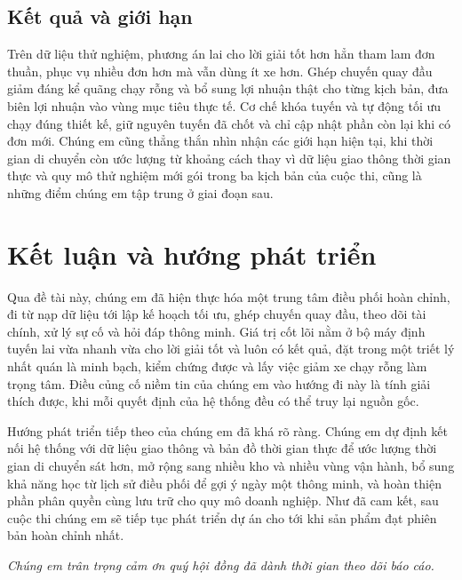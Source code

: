\documentclass[12pt,a4paper,oneside]{report}
\begin{document}
\section{Kết quả và giới hạn}
Trên dữ liệu thử nghiệm, phương án lai cho lời giải tốt hơn hẳn tham lam đơn thuần, phục vụ nhiều đơn hơn mà vẫn dùng ít xe hơn. Ghép chuyến quay đầu giảm đáng kể quãng chạy rỗng và bổ sung lợi nhuận thật cho từng kịch bản, đưa biên lợi nhuận vào vùng mục tiêu thực tế. Cơ chế khóa tuyến và tự động tối ưu chạy đúng thiết kế, giữ nguyên tuyến đã chốt và chỉ cập nhật phần còn lại khi có đơn mới. Chúng em cũng thẳng thắn nhìn nhận các giới hạn hiện tại, khi thời gian di chuyển còn ước lượng từ khoảng cách thay vì dữ liệu giao thông thời gian thực và quy mô thử nghiệm mới gói trong ba kịch bản của cuộc thi, cũng là những điểm chúng em tập trung ở giai đoạn sau.

\chapter{Kết luận và hướng phát triển}

Qua đề tài này, chúng em đã hiện thực hóa một trung tâm điều phối hoàn chỉnh, đi từ nạp dữ liệu tới lập kế hoạch tối ưu, ghép chuyến quay đầu, theo dõi tài chính, xử lý sự cố và hỏi đáp thông minh. Giá trị cốt lõi nằm ở bộ máy định tuyến lai vừa nhanh vừa cho lời giải tốt và luôn có kết quả, đặt trong một triết lý nhất quán là minh bạch, kiểm chứng được và lấy việc giảm xe chạy rỗng làm trọng tâm. Điều củng cố niềm tin của chúng em vào hướng đi này là tính giải thích được, khi mỗi quyết định của hệ thống đều có thể truy lại nguồn gốc.

Hướng phát triển tiếp theo của chúng em đã khá rõ ràng. Chúng em dự định kết nối hệ thống với dữ liệu giao thông và bản đồ thời gian thực để ước lượng thời gian di chuyển sát hơn, mở rộng sang nhiều kho và nhiều vùng vận hành, bổ sung khả năng học từ lịch sử điều phối để gợi ý ngày một thông minh, và hoàn thiện phần phân quyền cùng lưu trữ cho quy mô doanh nghiệp. Như đã cam kết, sau cuộc thi chúng em sẽ tiếp tục phát triển dự án cho tới khi sản phẩm đạt phiên bản hoàn chỉnh nhất.

\vspace{0.6cm}
\begin{center}
\itshape Chúng em trân trọng cảm ơn quý hội đồng đã dành thời gian theo dõi báo cáo.
\end{center}
\end{document}
